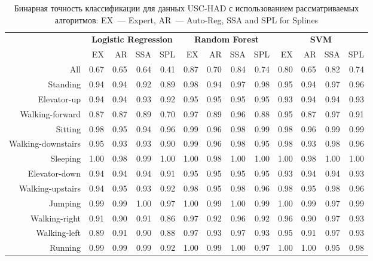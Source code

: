 \begin{table}[!ht]
	\centering
	\footnotesize
	\caption{Бинарная точность классификации для данных USC-HAD с использованием рассматриваемых алгоритмов: EX~--- Expert, AR~--- Auto-Reg, SSA and  SPL for Splines}
	\label{my-label}
	\begin{tabular}{r|rrrr|rrrr|rrrr|}
		& \multicolumn{4}{c|}{\textbf{Logistic Regression}} & \multicolumn{4}{c|}{\textbf{Random Forest}} & \multicolumn{4}{c|}{\textbf{SVM}}          \\ \cline{2-13} 
		& EX   & AR   & SSA   & SPL  & EX  & AR & SSA & SPL & EX & AR & SSA & SPL \\ \hline
		All& 0.67 & 0.65 & 0.64 & 0.41 & 0.87 & 0.70 & 0.84 & 0.74 & 0.80 & 0.65 & 0.82 & 0.74 \\
		Standing& 0.94 & 0.94 & 0.92 & 0.89 & 0.98 & 0.94 & 0.97 & 0.98 & 0.95 & 0.94 & 0.97 & 0.96 \\
		Elevator-up& 0.94 & 0.94 & 0.93 & 0.92 & 0.95 & 0.95 & 0.95 & 0.95 & 0.93 & 0.94 & 0.94 & 0.93 \\
		Walking-forward& 0.87 & 0.87 & 0.89 & 0.70 & 0.97 & 0.89 & 0.96 & 0.88 & 0.95 & 0.87 & 0.97 & 0.91 \\
		Sitting& 0.98 & 0.95 & 0.94 & 0.96 & 0.99 & 0.96 & 0.98 & 0.99 & 0.98 & 0.96 & 0.99 & 0.99 \\
		Walking-downstairs& 0.95 & 0.93 & 0.93 & 0.90 & 0.99 & 0.96 & 0.98 & 0.95 & 0.98 & 0.93 & 0.98 & 0.96 \\
		Sleeping& 1.00 & 0.98 & 0.99 & 1.00 & 1.00 & 0.98 & 1.00 & 1.00 & 1.00 & 0.98 & 1.00 & 1.00 \\
		Elevator-down& 0.94 & 0.94 & 0.94 & 0.91 & 0.95 & 0.95 & 0.95 & 0.95 & 0.93 & 0.94 & 0.94 & 0.93 \\
		Walking-upstairs& 0.94 & 0.95 & 0.93 & 0.92 & 0.98 & 0.95 & 0.98 & 0.96 & 0.98 & 0.95 & 0.98 & 0.96 \\
		Jumping& 0.99 & 0.99 & 1.00 & 0.97 & 1.00 & 0.99 & 1.00 & 0.99 & 1.00 & 0.99 & 0.97 & 0.99 \\
		Walking-right& 0.91 & 0.90 & 0.91 & 0.86 & 0.97 & 0.92 & 0.96 & 0.92 & 0.96 & 0.90 & 0.97 & 0.93 \\
		Walking-left& 0.89 & 0.91 & 0.90 & 0.88 & 0.97 & 0.93 & 0.97 & 0.93 & 0.95 & 0.91 & 0.97 & 0.93 \\
		Running& 0.99 & 0.99 & 0.99 & 0.92 & 1.00 & 0.99 & 1.00 & 0.97 & 1.00 & 1.00 & 0.95 & 0.98\\ \hline
	\end{tabular}
	\label{ch6:tbl:uschad_methods_results}
\end{table}

